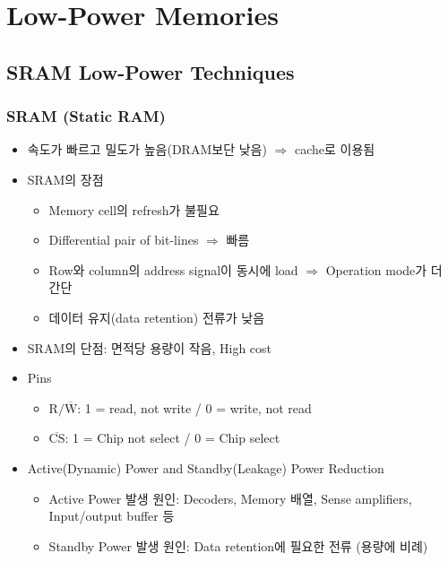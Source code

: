 \section{Low-Power Memories}

\subsection{SRAM Low-Power Techniques}

\subsubsection*{SRAM (Static RAM)}
\begin{itemize}
    \item 속도가 빠르고 밀도가 높음(DRAM보단 낮음) $\Rightarrow$ cache로 이용됨
    \item SRAM의 장점
    \begin{itemize}
        \item Memory cell의 refresh가 불필요
        \item Differential pair of bit-lines $\Rightarrow$ 빠름
        \item Row와 column의 address signal이 동시에 load $\Rightarrow$ Operation mode가 더 간단
        \item 데이터 유지(data retention) 전류가 낮음
    \end{itemize}
    \item SRAM의 단점: 면적당 용량이 작음, High cost
    \item Pins
    \begin{itemize}
        \item $\mathrm{R/\overline{W}}$: 1 = read, not write / 0 = write, not read
        \item $\mathrm{\overline{CS}}$: 1 = Chip not select / 0 = Chip select
    \end{itemize}
    \begin{figures}
    \end{figures}
    \item Active(Dynamic) Power and Standby(Leakage) Power Reduction
    \begin{itemize}
        \item Active Power 발생 원인: Decoders, Memory 배열, Sense amplifiers, Input/output buffer 등
        \item Standby Power 발생 원인: Data retention에 필요한 전류 (용량에 비례)
    \end{itemize}
\end{itemize}

